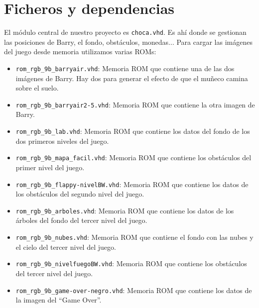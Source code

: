 \documentclass[11pt, a4paper, spanish, openright, twoside]{book}
\begin{document}
\newpage
\mbox{}
\thispagestyle{empty}						%
\newpage


\tableofcontents 							%

\newpage


\vspace{3cm}


\section{Ficheros y dependencias}
El módulo central de nuestro proyecto es \texttt{choca.vhd}. Es ahí donde se gestionan las posiciones de Barry, el fondo, obstáculos, monedas... Para cargar las imágenes del juego desde memoria utilizamos varias ROMs:

\begin{itemize}

	\item \texttt{rom\_rgb\_9b\_barryair.vhd}: Memoria ROM que contiene una de las dos imágenes de Barry.	Hay dos para generar el efecto de que el muñeco camina sobre el suelo.
	\item \texttt{rom\_rgb\_9b\_barryair2-5.vhd}: Memoria ROM que contiene la otra imagen de Barry.
	\item \texttt{rom\_rgb\_9b\_lab.vhd}: Memoria ROM que contiene los datos del fondo de los dos primeros niveles del juego.
	\item \texttt{rom\_rgb\_9b\_mapa\_facil.vhd}: Memoria ROM que contiene los obstáculos del primer nivel del juego.
	\item \texttt{rom\_rgb\_9b\_flappy-nivelBW.vhd}: Memoria ROM que contiene los datos de los obstáculos del segundo nivel del juego.
	\item \texttt{rom\_rgb\_9b\_arboles.vhd}: Memoria ROM que contiene los datos de los árboles del fondo del tercer nivel del juego.
	\item \texttt{rom\_rgb\_9b\_nubes.vhd}: Memoria ROM que contiene el fondo con las nubes y el cielo del tercer nivel del juego.
	\item \texttt{rom\_rgb\_9b\_nivelfuegoBW.vhd}: Memoria ROM que contiene los obstáculos del tercer nivel del juego.
	\item \texttt{rom\_rgb\_9b\_game-over-negro.vhd}: Memoria ROM que contiene los datos de la imagen del ``Game Over''.
	
\end{itemize}
\end{document}
